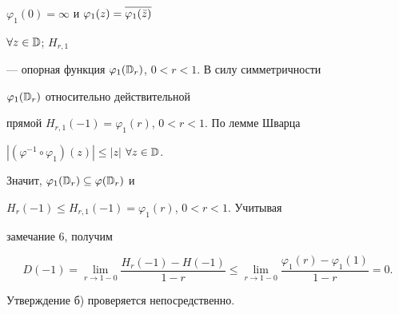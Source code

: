 $\varphi_1(0)=\infty$ и $\varphi_1(z)=\overline{\varphi_1(\Bar z)}$ 


$\forall z\in\Bbb D$; $H_{r,1}$


--- опорная функция $\varphi_1(\Bbb D_r)$, $0<r<1$. В силу симметричности 


$\varphi_1(\Bbb D_r)$ относительно действительной 


прямой $H_{r,1}(-1)=\varphi_1(r)$, $0<r<1$. По лемме Шварца 


$|(\varphi^{-1}\circ\varphi_1)(z)|\le|z|$ $\forall z\in\Bbb D$. 


Значит, $\varphi_1(\Bbb D_r)\subseteq\varphi(\Bbb D_r)$ и 


$H_r(-1)\le H_{r,1}(-1)=\varphi_1(r)$, $0<r<1$. Учитывая 


замечание 6, получим 


$$ 


D(-1)=\lim_{r\to 1-0}\frac{H_r(-1)-H(-1)}{1-r}\le 


\lim_{r\to 1-0}\frac{\varphi_1(r)-\varphi_1(1)}{1-r}=0. 


$$ 


Утверждение б) проверяется непосредственно. 


 


